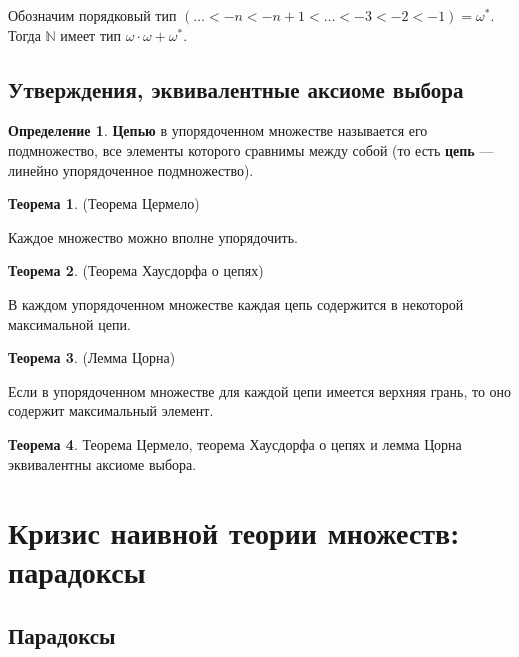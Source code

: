 \documentclass[12pt,oneside]{article}
\theoremstyle{definition}
\newtheorem{definition}{Определение}
\newtheorem{theorem}{Теорема}[section]
\begin{document}
Обозначим порядковый тип $(\dots < -n < -n + 1 < \dots < -3 < -2 < -1) = \omega^*$. Тогда $\mathbb{N}$ имеет тип $\omega\cdot\omega + \omega^*$.

\subsection{Утверждения, эквивалентные аксиоме выбора}

\begin{definition}
\textbf{Цепью} в упорядоченном множестве называется его подмножество, все элементы которого сравнимы между собой (то есть \textbf{цепь} --- линейно упорядоченное подмножество).
\end{definition}




\begin{theorem}{(Теорема Цермело)}

Каждое множество можно вполне упорядочить.
\end{theorem}

\begin{theorem}{(Теорема Хаусдорфа о цепях)}

В каждом упорядоченном множестве каждая цепь содержится в некоторой максимальной цепи.
\end{theorem}

\begin{theorem}{(Лемма Цорна)}

Если в упорядоченном множестве для каждой цепи имеется верхняя грань, то оно содержит максимальный элемент.
\end{theorem}

\begin{theorem}
Теорема Цермело, теорема Хаусдорфа о цепях и лемма Цорна эквивалентны аксиоме выбора.
\end{theorem}



\section{Кризис наивной теории множеств: парадоксы}

\subsection{Парадоксы}
\end{document}
